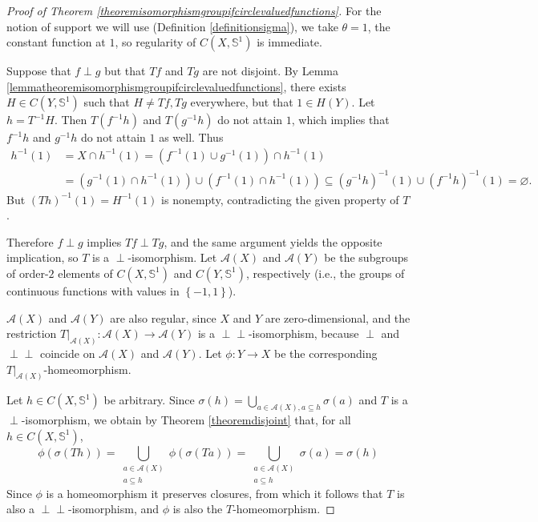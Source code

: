\documentclass[letter,11pt]{amsart}
\theoremstyle{plain}		\newtheorem{theorem}[generalnumbering]{Theorem}
\theoremstyle{plain}		\newtheorem{corollary}[generalnumbering]{Corollary}
\theoremstyle{definition}		\newtheorem{definition}[generalnumbering]{Definition}
\theoremstyle{definition}		\newtheorem{example}[generalnumbering]{Example}
\theoremstyle{plain}		\newtheorem{proposition}[generalnumbering]{Proposition}
\theoremstyle{plain}		\newtheorem{lemma}[generalnumbering]{Lemma}
\theoremstyle{plain}    \newtheorem{plainstyle}[generalnumbering]{\namefordifferentenvironment}
\theoremstyle{plain}    \newtheorem*{plainstyle*}{\namefordifferentenvironment}
\theoremstyle{definition}    \newtheorem{definitionstyle}[generalnumbering]{\namefordifferentenvironment}
\theoremstyle{definition}    \newtheorem*{definitionstyle*}{\namefordifferentenvironment}
\newcommand{\perpp}{\perp\!\!\!\perp}
\begin{document}
\begin{proof}[Proof of Theorem \ref{theoremisomorphismgroupifcirclevaluedfunctions}]
	For the notion of support we will use (Definition \ref{definitionsigma}), we take $\theta=1$, the constant function at $1$, so regularity of $C(X,\mathbb{S}^1)$ is immediate. 
	
	Suppose that $f\perp g$ but that $Tf$ and $Tg$ are not disjoint. By Lemma \ref{lemmatheoremisomorphismgroupifcirclevaluedfunctions}, there exists $H\in C(Y,\mathbb{S}^1)$ such that $H\neq Tf,Tg$ everywhere, but that $1\in H(Y)$. Let $h=T^{-1}H$. Then $T(f^{-1}h)$ and $T(g^{-1}h)$ do not attain $1$, which implies that $f^{-1}h$ and $g^{-1}h$ do not attain $1$ as well. Thus
	\begin{align*}
	h^{-1}(1)&=X\cap h^{-1}(1)=(f^{-1}(1)\cup g^{-1}(1))\cap h^{-1}(1)\\
	&=(g^{-1}(1)\cap h^{-1}(1))\cup(f^{-1}(1)\cap h^{-1}(1))\subseteq (g^{-1}h)^{-1}(1)\cup (f^{-1}h)^{-1}(1)=\varnothing.
	\end{align*}
	But $(Th)^{-1}(1)=H^{-1}(1)$ is nonempty, contradicting the given property of $T$.
	
	Therefore $f\perp g$ implies $Tf\perp Tg$, and the same argument yields the opposite implication, so $T$ is a $\perp$-isomorphism. Let $\mathcal{A}(X)$ and $\mathcal{A}(Y)$ be the subgroups of order-$2$ elements of $C(X,\mathbb{S}^1)$ and $C(Y,\mathbb{S}^1)$, respectively (i.e., the groups of continuous functions with values in $\left\{-1,1\right\}$).
	
	$\mathcal{A}(X)$ and $\mathcal{A}(Y)$ are also regular, since $X$ and $Y$ are zero-dimensional, and the restriction $T|_{\mathcal{A}(X)}\colon\mathcal{A}(X)\to \mathcal{A}(Y)$ is a $\perpp$-isomorphism, because $\perp$ and $\perpp$ coincide on $\mathcal{A}(X)$ and $\mathcal{A}(Y)$. Let $\phi\colon Y\to X$ be the corresponding $T|_{\mathcal{A}(X)}$-homeomorphism. 
	
	Let $h\in C(X,\mathbb{S}^1)$ be arbitrary. Since $\sigma(h)=\bigcup_{a\in \mathcal{A}(X),a\subseteq h}\sigma(a)$ and $T$ is a $\perp$-isomorphism, we obtain by Theorem \ref{theoremdisjoint} that, for all $h\in C(X,\mathbb{S}^1)$,
	\[\phi(\sigma(Th))=\bigcup_{\substack{a\in \mathcal{A}(X)\\a\subseteq h}}\phi(\sigma(Ta))=\bigcup_{\substack{a\in \mathcal{A}(X)\\a\subseteq h}}\sigma(a)=\sigma(h)\]
	Since $\phi$ is a homeomorphism it preserves closures, from which it follows that $T$ is also a $\perpp$-isomorphism, and $\phi$ is also the $T$-homeomorphism.
	

\end{proof}
\end{document}
